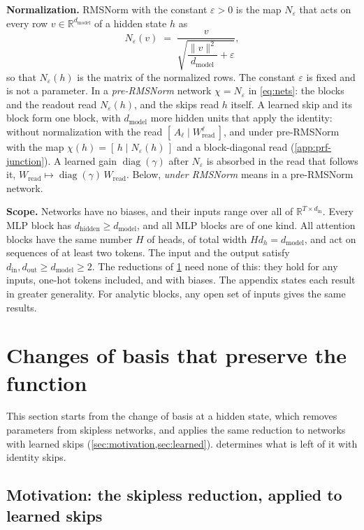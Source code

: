 \documentclass[10pt]{article}
\theoremstyle{definition}
\theoremstyle{remark}
\newcommand{\R}{\mathbb{R}}
\newcommand{\Wread}{W_{\mathrm{read}}}
\newcommand{\dm}{d_{\mathrm{model}}}
\newcommand{\dhid}{d_{\mathrm{hidden}}}
\newcommand{\norm}[1]{\lVert #1\rVert}
\newcommand{\para}[1]{\smallskip\noindent\textbf{#1}\hspace{0.5em}}
\begin{document}
\para{Normalization.} RMSNorm with the constant $\varepsilon > 0$ is the map $N_\varepsilon$ that acts on every row $v \in \R^{\dm}$ of a hidden state $h$ as
\[
N_\varepsilon(v) \;=\; \frac{v}{\sqrt{\dfrac{\norm{v}^2}{\dm} + \varepsilon}} ,
\]
so that $N_\varepsilon(h)$ is the matrix of the normalized rows. The constant $\varepsilon$ is fixed and is not a parameter. In a \emph{pre-RMSNorm} network $\chi = N_\varepsilon$ in \eqref{eq:nets}: the blocks and the readout read $N_\varepsilon(h)$, and the skips read $h$ itself. A learned skip and its block form one block, with $\dm$ more hidden units that apply the identity: without normalization with the read $[\,A_\ell \mid \Wread^{\ell}\,]$, and under pre-RMSNorm with the map $\chi(h) = [\,h \mid N_\varepsilon(h)\,]$ and a block-diagonal read (\cref{app:prf-junction}).
A learned gain $\operatorname{diag}(\gamma)$ after $N_\varepsilon$ is absorbed in the read that follows it, $\Wread \mapsto \operatorname{diag}(\gamma)\,\Wread$. Below, \emph{under RMSNorm} means in a pre-RMSNorm network.

\para{Scope.} Networks have no biases, and their inputs range over all of $\R^{T\times d_{\mathrm{in}}}$. Every MLP block has $\dhid \ge \dm$, and all MLP blocks are of one kind. All attention blocks have the same number $H$ of heads, of total width $Hd_h = \dm$, and act on sequences of at least two tokens. The input and the output satisfy $d_{\mathrm{in}}, d_{\mathrm{out}} \ge \dm \ge 2$. The reductions of \cref{sec:reduce} need none of this: they hold for any inputs, one-hot tokens included, and with biases. The appendix states each result in greater generality. For analytic blocks, any open set of inputs gives the same results.

\section{Changes of basis that preserve the function}\label{sec:reduce}\label{sec:gauge}

This section starts from the change of basis at a hidden state, which removes parameters from skipless networks, and applies the same reduction to networks with learned skips (\cref{sec:motivation,sec:learned}).  determines what is left of it with identity skips.

\subsection{Motivation: the skipless reduction, applied to learned skips}\label{sec:motivation}
\end{document}

